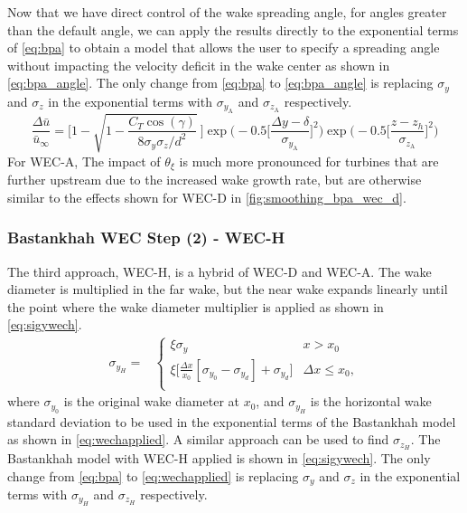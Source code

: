 \documentclass{jpconf}
\begin{document}
Now that we have direct control of the wake spreading angle, for angles greater than the default angle, we can apply the results directly to the exponential terms of \cref{eq:bpa} to obtain a model that allows the user to specify a spreading angle without impacting the velocity deficit in the wake center as shown in \cref{eq:bpa_angle}. The only change from \cref{eq:bpa} to \cref{eq:bpa_angle} is replacing $\sigma_y$ and $\sigma_z$ in the exponential terms with $\sigma_{y_{\text{A}}}$ and $\sigma_{z_{\text{A}}}$ respectively.
\begin{equation}
	\frac{\Delta \bar{u}}{\bar{u}_{\infty}} = \Bigg[1-\sqrt{1-\frac{C_T \cos{(\gamma)}}{8 \sigma_y \sigma_z/d^2}}~\Bigg] \exp{\bigg(-0.5\Big[\frac{\Delta y-\delta}{\sigma_{y_{\text{A}}}}\Big]^2\bigg)}\exp{\bigg(-0.5\Big[\frac{z-z_h}{\sigma_{z_{\text{A}}}}\Big]^2\bigg)}
	\label{eq:bpa_angle}
\end{equation}
%
For WEC-A, The impact of $\theta_\xi$ is much more pronounced for turbines that are further upstream due to the increased wake growth rate, but are otherwise similar to the effects shown for WEC-D in \cref{fig:smoothing_bpa_wec_d}.

\subsubsection{Bastankhah WEC Step (2) - WEC-H}

The third approach, WEC-H, is a hybrid of WEC-D and WEC-A. The wake diameter is multiplied in the far wake, but the near wake expands linearly until the point where the wake diameter multiplier is applied as shown in \cref{eq:sigywech}.
%
\begin{align}\label{eq:sigywech}
	\sigma_{y_H} = &
	\begin{cases}
		\xi \sigma_y & x > x_0 \\
		\xi \big[\frac{\Delta x}{x_0}[\sigma_{y_0} - \sigma_{y_d}] + \sigma_{y_d} \big]& \Delta x \le x_0, \\
	\end{cases}
\end{align}
%
where $\sigma_{y_0}$ is the original wake diameter at $x_0$, and $\sigma_{y_H}$ is the horizontal wake standard deviation to be used in the exponential terms of the Bastankhah model as shown in \cref{eq:wechapplied}. A similar approach can be used to find $\sigma_{z_H}$. The Bastankhah model with WEC-H applied is shown in \cref{eq:sigywech}. The only change from \cref{eq:bpa} to \cref{eq:wechapplied} is replacing $\sigma_y$ and $\sigma_z$ in the exponential terms with $\sigma_{y_{H}}$ and $\sigma_{z_{H}}$ respectively.
\end{document}
